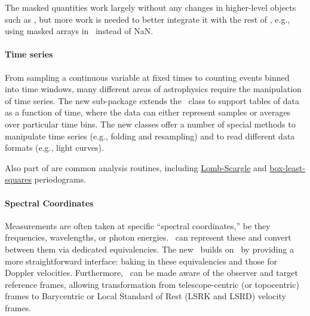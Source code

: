 \documentclass[modern]{aastex631}
\begin{document}
The masked quantities work largely without any changes in higher-level objects
such as \astropySkyCoord, but more work is needed to better integrate it with
the rest of \astropypkg, e.g., using masked arrays in \astropyTime\ instead of NaN.

\paragraph{Time series}  From sampling a continuous variable at fixed times to
counting events binned into time windows, many different areas of astrophysics
require the manipulation of time series. The new 
sub-package extends the \astropyQTable\ class to support tables of data as a
function of time, where the data can either represent samples or averages over
particular time bins. The new classes offer a number of special methods to
manipulate time series (e.g., folding and resampling) and to read different data
formats (e.g.,  light curves).

Also part of  are common analysis routines, including
\href{https://docs.astropy.org/en/stable/timeseries/lombscargle.html}{Lomb-Scargle}
and
\href{https://docs.astropy.org/en/stable/timeseries/bls.html}{box-least-squares}
periodograms.

\paragraph{Spectral Coordinates} Measurements are often taken at specific
``spectral coordinates,'' be they frequencies, wavelengths, or photon energies.
\astropyQuantity\ can represent these and convert between them via dedicated
equivalencies. The new \astropySpectralCoord\ builds on \astropyQuantity\ by
providing a more straightforward interface: baking in these equivalencies and
those for Doppler velocities. Furthermore, \astropySpectralCoord\ can be made
aware of the observer and target reference frames, allowing transformation from
telescope-centric (or topocentric) frames to Barycentric or Local Standard of
Rest (LSRK and LSRD) velocity frames.
\end{document}
